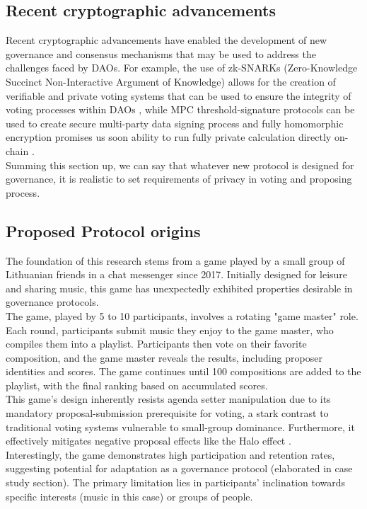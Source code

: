 \documentclass{article}
\begin{document}
\begin{CJK}{UTF8}{gbsn}
\begin{multicols}{2}
        \subsection{Recent cryptographic advancements}
        Recent cryptographic advancements have enabled the development of new governance and consensus mechanisms that may be used to address the challenges faced by DAOs. For example, the use of zk-SNARKs (Zero-Knowledge Succinct Non-Interactive Argument of Knowledge) allows for the creation of verifiable and private voting systems that can be used to ensure the integrity of voting processes within DAOs \cite{Ben-Sasson2014}, while MPC threshold-signature protocols can be used to create secure multi-party data signing process \cite{Doerner2023} and fully homomorphic encryption promises us soon ability to run fully private calculation directly on-chain \cite{Fhenix}.\\
        Summing this section up, we can say that whatever new protocol is designed for governance, it is realistic to set requirements of privacy in voting and proposing process.

        \subsection{Proposed Protocol origins}\label{sec:protocol_origins}
        The foundation of this research stems from a game played by a small group of Lithuanian friends in a chat messenger since 2017. Initially designed for leisure and sharing music, this game has unexpectedly exhibited properties desirable in governance protocols.\\
        The game, played by 5 to 10 participants, involves a rotating "game master" role. Each round, participants submit music they enjoy to the game master, who compiles them into a playlist. Participants then vote on their favorite composition, and the game master reveals the results, including proposer identities and scores. The game continues until 100 compositions are added to the playlist, with the final ranking based on accumulated scores\cite{DariusYoutube}.\\
        This game's design inherently resists agenda setter manipulation due to its mandatory proposal-submission prerequisite for voting, a stark contrast to traditional voting systems vulnerable to small-group dominance\cite{McKelvey1976}. Furthermore, it effectively mitigates negative proposal effects like the Halo effect \cite{Verhulst2010}. \\
        Interestingly, the game demonstrates high participation and retention rates, suggesting potential for adaptation as a governance protocol (elaborated in case study section). The primary limitation lies in participants' inclination towards specific interests (music in this case) or groups of people.


\end{multicols}
\end{CJK}
\end{document}
